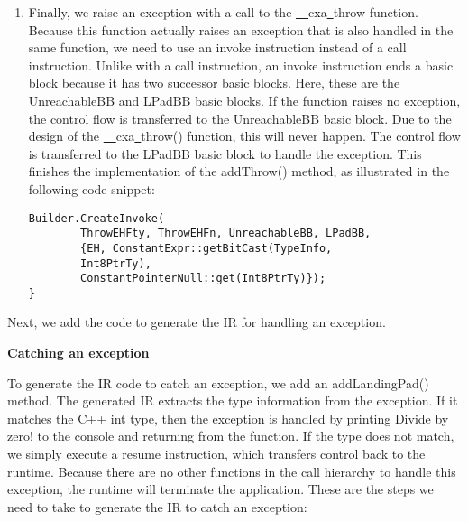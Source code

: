 \begin{enumerate}
\item Finally, we raise an exception with a call to the \underline{~~}cxa\underline{~}throw function. Because this function actually raises an exception that is also handled in the same function, we need to use an invoke instruction instead of a call instruction. Unlike with a call instruction, an invoke instruction ends a basic block because it has two successor basic blocks. Here, these are the UnreachableBB and LPadBB basic blocks. If the function raises no exception, the control flow is transferred to the UnreachableBB basic block. Due to the design of the \underline{~~}cxa\underline{~}throw() function, this will never happen. The control flow is transferred to the LPadBB basic block to handle the exception. This finishes the implementation of the addThrow() method, as illustrated in the following code snippet:
\begin{lstlisting}[caption={}]
	Builder.CreateInvoke(
		ThrowEHFty, ThrowEHFn, UnreachableBB, LPadBB,
		{EH, ConstantExpr::getBitCast(TypeInfo, 
		Int8PtrTy),
		ConstantPointerNull::get(Int8PtrTy)});
}
\end{lstlisting}
\end{enumerate}

Next, we add the code to generate the IR for handling an exception.\par

\hspace*{\fill} \par %
\textbf{Catching an exception}

To generate the IR code to catch an exception, we add an addLandingPad() method. The generated IR extracts the type information from the exception. If it matches the C++ int type, then the exception is handled by printing Divide by zero! to the console and returning from the function. If the type does not match, we simply execute a resume instruction, which transfers control back to the runtime. Because there are no other functions in the call hierarchy to handle this exception, the runtime will terminate the application. These are the steps we need to take to generate the IR to catch an exception:\par

